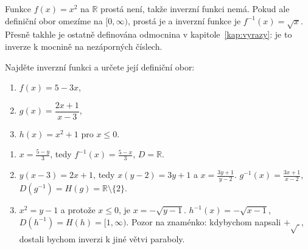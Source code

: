 \begin{example}
  Funkce $f(x) = x^2$ na $\mathbb{R}$ prostá není, takže inverzní funkci nemá. Pokud ale definiční obor omezíme na $[0, \infty)$, prostá je a inverzní funkce je $f^{-1}(x) = \sqrt{x}$. Přesně takhle je ostatně definována odmocnina v kapitole~\ref{kap:vyrazy}: je to inverze k mocnině na nezáporných číslech.
  \begin{center}
  \end{center}
\end{example}

\begin{problem}
  Najděte inverzní funkci a určete její definiční obor:
  \begin{enumerate}[label=(\alph*)]
    \item $f(x) = 5 - 3x$,
    \item $g(x) = \dfrac{2x + 1}{x - 3}$,
    \item $h(x) = x^2 + 1$ pro $x\leq 0$.
  \end{enumerate}
\end{problem}

\begin{solution}
  \begin{enumerate}[label=(\alph*)]
    \item $x = \frac{5 - y}{3}$, tedy $f^{-1}(x) = \frac{5 - x}{3}$, $D = \mathbb{R}$.
    \item $y(x - 3) = 2x + 1$, tedy $x(y - 2) = 3y + 1$ a $x = \frac{3y + 1}{y - 2}$. $g^{-1}(x) = \frac{3x + 1}{x - 2}$, $D(g^{-1}) = H(g) = \mathbb{R}\setminus\{2\}$.
    \item $x^2 = y - 1$ a protože $x\leq 0$, je $x = -\sqrt{y - 1}$. $h^{-1}(x) = -\sqrt{x - 1}$, $D(h^{-1}) = H(h) = [1, \infty)$. Pozor na znaménko: kdybychom napsali $+\sqrt{\ }$, dostali bychom inverzi k jiné větvi paraboly.
  \end{enumerate}
\end{solution}

